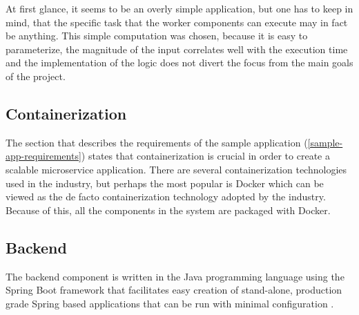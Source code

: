 At first glance, it seems to be an overly simple application, but one has to keep in mind, that the specific task that the worker components can execute may in fact be anything. This simple computation was chosen, because it is easy to parameterize, the magnitude of the input correlates well with the execution time and the implementation of the logic does not divert the focus from the main goals of the project.

\subsection{Containerization}

The section that describes the requirements of the sample application (\ref{sample-app-requirements}) states that containerization is crucial in order to create a scalable microservice application. There are several containerization technologies used in the industry, but perhaps the most popular is Docker \cite{Docker} which can be viewed as the de facto containerization technology adopted by the industry. Because of this, all the components in the system are packaged with Docker.


\subsection{Backend}


The backend component is written in the Java programming language using the Spring Boot framework that facilitates easy creation of stand-alone, production grade Spring based applications that can be run with minimal configuration \cite{SpringBoot}.

